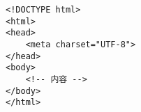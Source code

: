 
\begin{issues}
\issueDraft
\end{issues}

\begin{lstlisting}[language=none]
<!DOCTYPE html>
<html>
<head>
    <meta charset="UTF-8">
</head>
<body>
    <!-- 内容 -->
</body>
</html>
\end{lstlisting}
